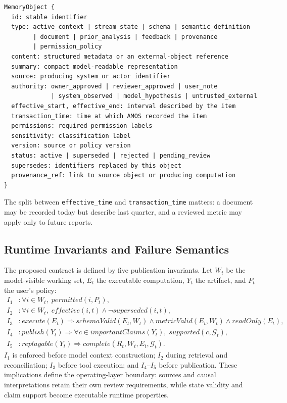 \documentclass[10pt]{article}
\newcommand{\prov}{\mathcal{G}}
\newcommand{\code}[1]{\texttt{#1}}
\begin{document}
\begin{verbatim}
MemoryObject {
  id: stable identifier
  type: active_context | stream_state | schema | semantic_definition
        | document | prior_analysis | feedback | provenance
        | permission_policy
  content: structured metadata or an external-object reference
  summary: compact model-readable representation
  source: producing system or actor identifier
  authority: owner_approved | reviewer_approved | user_note
             | system_observed | model_hypothesis | untrusted_external
  effective_start, effective_end: interval described by the item
  transaction_time: time at which AMOS recorded the item
  permissions: required permission labels
  sensitivity: classification label
  version: source or policy version
  status: active | superseded | rejected | pending_review
  supersedes: identifiers replaced by this object
  provenance_ref: link to source object or producing computation
}
\end{verbatim}

The split between \code{effective\_time} and \code{transaction\_time} matters: a document may be recorded today but describe last quarter, and a reviewed metric may apply only to future reports.

\subsection{Runtime Invariants and Failure Semantics}
The proposed contract is defined by five publication invariants. Let $W_t$ be the model-visible working set, $E_t$ the executable computation, $Y_t$ the artifact, and $P_t$ the user's policy:
\begin{align}
I_1 &: \forall i \in W_t,\; permitted(i,P_t), \\
I_2 &: \forall i \in W_t,\; effective(i,t) \land \neg superseded(i,t), \\
I_3 &: execute(E_t) \Rightarrow schemaValid(E_t,W_t) \land metricValid(E_t,W_t) \land readOnly(E_t), \\
I_4 &: publish(Y_t) \Rightarrow \forall c \in importantClaims(Y_t),\; supported(c,\prov_t), \\
I_5 &: replayable(Y_t) \Rightarrow complete(R_t,W_t,E_t,\prov_t).
\end{align}
$I_1$ is enforced before model context construction; $I_2$ during retrieval and reconciliation; $I_3$ before tool execution; and $I_4$--$I_5$ before publication. These implications define the operating-layer boundary: sources and causal interpretations retain their own review requirements, while state validity and claim support become executable runtime properties.
\end{document}
